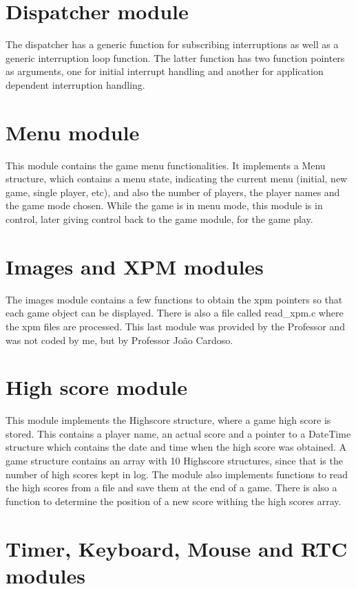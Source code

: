 \documentclass[11pt,a4paper,reqno]{report}
\numberwithin{equation}{section}
\begin{document}
\section{Dispatcher module}

The dispatcher has a generic function for subscribing interruptions as well as a generic interruption loop function. The latter function has two function pointers as arguments, one for initial interrupt handling and another for application dependent interruption handling.

\section{Menu module}

This module contains the game menu functionalities. It implements a Menu structure, which contains a menu state, indicating the current menu (initial, new game, single player, etc), and also the number of players, the player names and the game mode chosen. While the game is in menu mode, this module is in control, later giving control back to the game module, for the game play.

\section{Images and XPM modules}

The images module contains a few functions to obtain the xpm pointers so that each game object can be displayed. There is also a file called read\_xpm.c where the xpm files are processed. This last module was provided by the Professor and was not coded by me, but by Professor João Cardoso.

\section{High score module}

This module implements the Highscore structure, where a game high score is stored. This contains a player name, an actual score and a pointer to a DateTime structure which contains the date and time when the high score was obtained. A game structure contains an array with 10 Highscore structures, since that is the number of high scores kept in log. The module also implements functions to read the high scores from a file and save them at the end of a game. There is also a function to determine the position of a new score withing the high scores array.

\section{Timer, Keyboard, Mouse and RTC modules}
\end{document}
